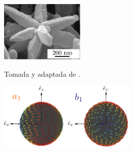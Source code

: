 \documentclass[a0paper,portrait]{baposter}
\begin{document}
\begin{poster}
{			
			\begin{minipage}[c]{.35\linewidth}
				\centering
				{\includegraphics[width=4cm]{flower.pdf}}
				\begin{singlespace}
					\tiny Tomada y adaptada de \cite{Mendez}.
				\end{singlespace}
					
			\end{minipage}
			\begin{minipage}[c]{.65\linewidth}
				\centering
				\includegraphics[width=6.5cm]{dipoleelectric.pdf}
			\end{minipage}	
		
			
		}
		

\end{poster}
\end{document}
